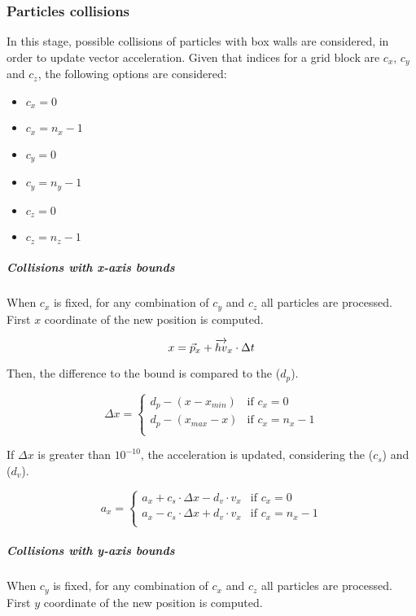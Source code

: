 \subsubsection{Particles collisions}

In this stage, possible collisions of particles with box walls are considered,
in order to update vector acceleration. 
Given that indices for a grid block are $c_x$, $c_y$ and $c_z$, the following
options are considered:

\begin{itemize}
\item $c_x=0$
\item $c_x=n_x-1$
\item $c_y=0$
\item $c_y=n_y-1$
\item $c_z=0$
\item $c_z=n_z-1$
\end{itemize}

\subparagraph{Collisions with x-axis bounds}

When $c_x$ is fixed, for any combination of $c_y$ and $c_z$ all particles are
processed. First $x$ coordinate of the new position is computed.

\[
x = \vec{p}_x + \overrightarrow{hv}_x \cdot \Delta t \\
\]

Then, the difference to the bound is compared to the  ($d_p$).

\[
\Delta x = 
\begin{cases}
d_p - (x - x_{min}) & \text{if } c_x = 0\\
d_p - (x_{max} - x) & \text{if } c_x = n_x -1\\
\end{cases}
\]

If $\Delta x$ is greater than $10^{-10}$, the acceleration is updated,
considering the  ($c_s$) and 
($d_v$).

\[
a_x = 
\begin{cases}
  a_x + c_s \cdot \Delta x - d_v \cdot v_x & \text{if  } c_x = 0\\
  a_x - c_s \cdot \Delta x + d_v \cdot v_x & \text{if  } c_x = n_x-1\\
\end{cases}
\]

\subparagraph{Collisions with y-axis bounds}

When $c_y$ is fixed, for any combination of $c_x$ and $c_z$ all particles are
processed. First $y$ coordinate of the new position is computed.

